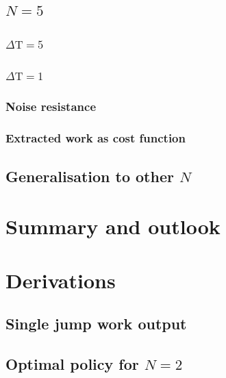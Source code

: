 \section{$N=5$}\label{n5}
\subsection{$\Delta \mathrm{T} = 5$}\label{n_5_ml}


\subsection{$\Delta \mathrm{T} = 1$}\label{n_5_dt1}


\subsection{Noise resistance}\label{ml_noise}


\subsection{Extracted work as cost function}\label{work_cost}


\section{Generalisation to other $N$}
 

\chapter{Summary and outlook}\label{outlook}





\appendix
\chapter{Derivations}
\section{Single jump work output}
 \label{deriv_jump}

\section{Optimal policy for $N=2$} \label{n2_opt_pol}

